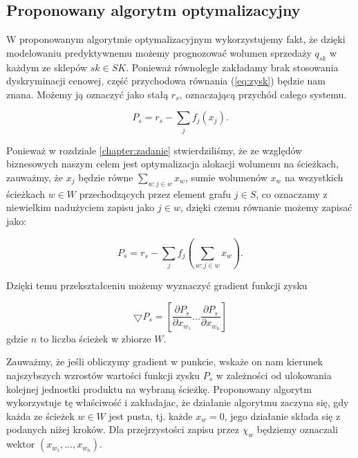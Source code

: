 \documentclass[polish, twoside, 12pt, a4paper]{article}
\theoremstyle{definition}
\theoremstyle{plain}
\theoremstyle{remark}
\begin{document}
\subsection{Proponowany algorytm optymalizacyjny} \label{chapter:algorytm}

W proponowanym algorytmie optymalizacyjnym wykorzystujemy fakt, że dzięki modelowaniu predyktywnemu możemy prognozować wolumen sprzedaży $q_{sk}$ w każdym ze sklepów $sk \in SK$. Ponieważ równolegle zakładamy brak stosowania dyskryminacji cenowej, część przychodowa równania (\ref{eq:zysk}) będzie nam znana. Możemy ją oznaczyć jako stałą $r_s$, oznaczającą  przychód całego systemu.  

\begin{equation} \label{eq:przychodsystemu}
P_s = r_s - \sum\limits_{j} f_j(x_j).
\end{equation}

Ponieważ w rozdziale \ref{chapter:zadanie} stwierdziliśmy, że ze względów biznesowych naszym celem jest optymalizacja alokacji wolumenu na ścieżkach, zauważmy, że $x_j$ będzie równe $\sum\limits_{w:j \in w} x_w$, sumie wolumenów $x_w$ na wszystkich ścieżkach $w \in W$ przechodzących przez element grafu $j \in S$, co oznaczamy z niewielkim nadużyciem zapisu jako $j \in w$, dzięki czemu równanie \label{eq:przychodsystemu} możemy zapisać jako: 

\begin{equation} \label{eq:przychodsystemu}
P_s = r_s - \sum\limits_{j} f_j(\sum\limits_{w:j \in w} x_w).
\end{equation}

Dzięki temu przekształceniu możemy wyznaczyć gradient funkcji zysku

\begin{equation} \label{eq:gradient}
\bigtriangledown P_s  = [\frac{\partial P_s}{\partial x_{w_1}}...\frac{\partial P_s}{\partial x_{w_n}}]
\end{equation}
gdzie $n$ to liczba ścieżek w zbiorze $W$.

Zauważmy, że jeśli obliczymy gradient w punkcie, wskaże on nam kierunek najszybszych wzrostów wartości funkcji zysku $P_s$ w zależności od ulokowania kolejnej jednostki produktu na wybraną ścieżkę. Proponowany algorytm wykorzystuje tę właściwość i zakładajac, że działanie algorytmu zaczyna się, gdy każda ze ścieżek $w \in W$ jest pusta, tj. każde $x_{w}=0$, jego działanie składa się z podanych niżej kroków. Dla przejrzystości zapisu przez $\chi_w$ będziemy oznaczali wektor $(x_{w_1},\ldots,x_{w_n})$. 
\end{document}
